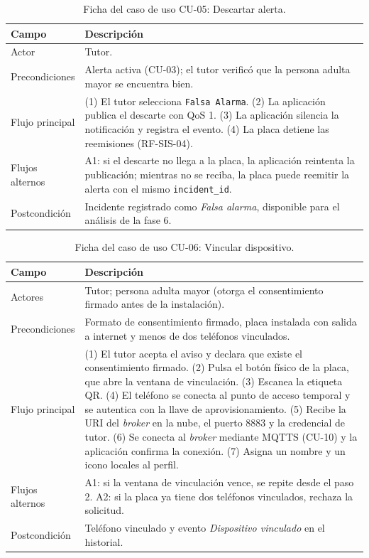 \documentclass[12pt,a4paper,oneside]{book}
\theoremstyle{plain}
\theoremstyle{definition}
\theoremstyle{remark}
\begin{document}
\begin{table}[H]
\centering
\caption{Ficha del caso de uso CU-05: Descartar alerta.}
\label{tab:cu-05}
\small
\begin{tabular}{L{3.0cm}L{9.0cm}}
\toprule
\textbf{Campo} & \textbf{Descripción} \\
\midrule
Actor & Tutor. \\
\addlinespace
Precondiciones & Alerta activa (CU-03); el tutor verificó que la persona adulta mayor se encuentra bien. \\
\addlinespace
Flujo principal & (1) El tutor selecciona \texttt{Falsa Alarma}. (2) La aplicación publica el descarte con QoS 1. (3) La aplicación silencia la notificación y registra el evento. (4) La placa detiene las reemisiones (RF-SIS-04). \\
\addlinespace
Flujos alternos & A1: si el descarte no llega a la placa, la aplicación reintenta la publicación; mientras no se reciba, la placa puede reemitir la alerta con el mismo \texttt{incident\_id}. \\
\addlinespace
Postcondición & Incidente registrado como \textit{Falsa alarma}, disponible para el análisis de la fase 6. \\
\bottomrule
\end{tabular}
\end{table}

\begin{table}[H]
\centering
\caption{Ficha del caso de uso CU-06: Vincular dispositivo.}
\label{tab:cu-06}
\small
\begin{tabular}{L{3.0cm}L{9.0cm}}
\toprule
\textbf{Campo} & \textbf{Descripción} \\
\midrule
Actores & Tutor; persona adulta mayor (otorga el consentimiento firmado antes de la instalación). \\
\addlinespace
Precondiciones & Formato de consentimiento firmado, placa instalada con salida a internet y menos de dos teléfonos vinculados. \\
\addlinespace
Flujo principal & (1) El tutor acepta el aviso y declara que existe el consentimiento firmado. (2) Pulsa el botón físico de la placa, que abre la ventana de vinculación. (3) Escanea la etiqueta QR. (4) El teléfono se conecta al punto de acceso temporal y se autentica con la llave de aprovisionamiento. (5) Recibe la URI del \textit{broker} en la nube, el puerto 8883 y la credencial de tutor. (6) Se conecta al \textit{broker} mediante MQTTS (CU-10) y la aplicación confirma la conexión. (7) Asigna un nombre y un icono locales al perfil. \\
\addlinespace
Flujos alternos & A1: si la ventana de vinculación vence, se repite desde el paso 2. A2: si la placa ya tiene dos teléfonos vinculados, rechaza la solicitud. \\
\addlinespace
Postcondición & Teléfono vinculado y evento \textit{Dispositivo vinculado} en el historial. \\
\bottomrule
\end{tabular}
\end{table}
\end{document}
